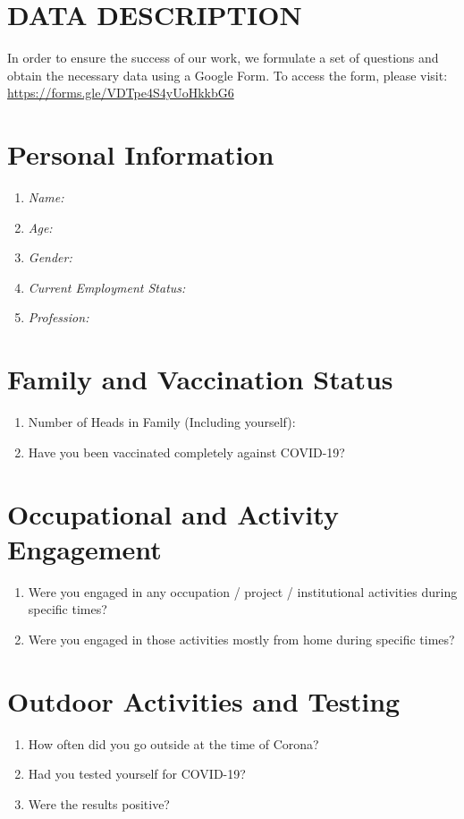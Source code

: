 \section{DATA DESCRIPTION}

In order to ensure the success of our work, we formulate a set of questions and obtain the necessary data using a Google Form. To access the form, please visit: \url{https://forms.gle/VDTpe4S4yUoHkkbG6}

\section*{Personal Information}
\begin{enumerate}
    \item \textit{Name:}
    \item \textit{Age:}
    \item \textit{Gender:}
    \item \textit{Current Employment Status:}
    \item \textit{Profession:}
\end{enumerate}

\section*{Family and Vaccination Status}
\begin{enumerate}[resume]
    \item Number of Heads in Family (Including yourself):
    \item Have you been vaccinated completely against COVID-19?
\end{enumerate}

\section*{Occupational and Activity Engagement}
\begin{enumerate}[resume]
    \item Were you engaged in any occupation / project / institutional activities during specific times?
    \item Were you engaged in those activities mostly from home during specific times?
\end{enumerate}

\section*{Outdoor Activities and Testing}
\begin{enumerate}[resume]
    \item How often did you go outside at the time of Corona?
    \item Had you tested yourself for COVID-19?
    \item Were the results positive?
\end{enumerate}

